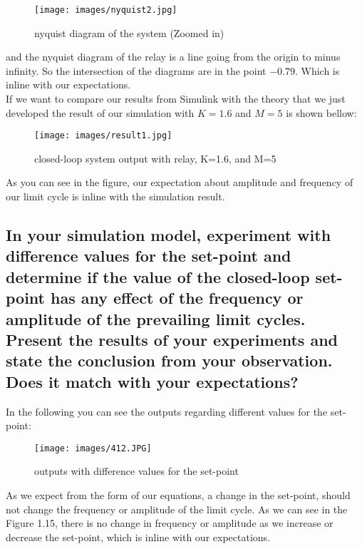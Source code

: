 \documentclass[11pt]{scrartcl} %
\begin{document}
\begin{figure}[H]
	\centering
	\texttt{[image: images/nyquist2.jpg]}
	\caption{nyquist diagram of the system (Zoomed in)}
\end{figure}

and the nyquist diagram of the relay is a line going from the origin to minus infinity. So the intersection of the diagrams are in the point $-0.79$. Which is inline with our expectations.\\

If we want to compare our results from Simulink with the theory that we just developed the result of our simulation with $K=1.6$ and $M=5$ is shown bellow:

\begin{figure}[H]
	\centering
	\texttt{[image: images/result1.jpg]}
	\caption{closed-loop system output with relay, K=1.6, and M=5}
\end{figure}

As you can see in the figure, our expectation about amplitude and frequency of our limit cycle is inline with the simulation result.

\subsection{ In your simulation model, experiment with diﬀerence values for the set-point and determine if the value of the closed-loop set-point has any eﬀect of the frequency or amplitude of the prevailing limit cycles. Present the results of your experiments and state the conclusion from your observation. Does it match with your expectations?}
In the following you can see the outputs regarding different values for the set-point:
\begin{figure}[H]
	\centering
	\texttt{[image: images/412.JPG]}
	\caption{outputs with diﬀerence values for the set-point}
\end{figure}

As we expect from the form of our equations, a change in the set-point, should not change the frequency or amplitude of the limit cycle. As we can see in the Figure 1.15, there is no change in frequency or amplitude as we increase or decrease the set-point, which is inline with our expectations.
\end{document}

